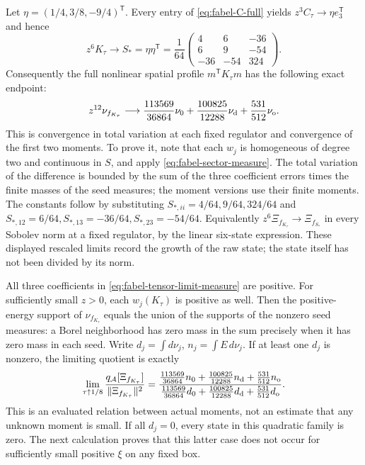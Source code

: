 Let $\eta=(1/4,3/8,-9/4)^{\mathsf T}$.
Every entry of \eqref{eq:fabel-C-full} yields
$z^3C_\tau\to\eta e_3^{\mathsf T}$ and hence
\[
 z^6K_\tau\longrightarrow S_*=\eta\eta^{\mathsf T}
 =\frac1{64}\begin{pmatrix}4&6&-36\\6&9&-54\\-36&-54&324\end{pmatrix}.
\]
Consequently the full nonlinear spatial profile
$m^{\mathsf T}K_\tau m$ has the following exact endpoint:
\begin{equation}\label{eq:fabel-tensor-limit-measure}
 z^{12}\nu_{f_{K_\tau}}\longrightarrow
 \frac{113569}{36864}\nu_0+
 \frac{100825}{12288}\nu_{\rm d}+
 \frac{531}{512}\nu_{\rm o}.
\end{equation}
This is convergence in total variation at each fixed regulator and
convergence of the first two moments. To prove it, note that each
$w_j$ is homogeneous of degree two and continuous in $S$, and apply
\eqref{eq:fabel-sector-measure}. The total variation of the difference
is bounded by the sum of the three coefficient errors times the finite
masses of the seed measures; the moment versions use their finite moments.
The constants follow by substituting $S_{*,ii}=4/64,9/64,324/64$ and
$S_{*,12}=6/64,S_{*,13}=-36/64,S_{*,23}=-54/64$.
Equivalently $z^6\Xi_{f_{K_\tau}}\to\Xi_{f_{S_*}}$ in every Sobolev norm
at a fixed regulator, by the linear six-state expression.
These displayed rescaled limits record the growth of the raw state;
the state itself has not been divided by its norm.

All three coefficients in \eqref{eq:fabel-tensor-limit-measure} are positive.
For sufficiently small $z>0$, each $w_j(K_\tau)$ is positive as well.
Then the positive-energy support of $\nu_{f_{K_\tau}}$ equals the union
of the supports of the nonzero seed measures: a Borel neighborhood
has zero mass in the sum precisely when it has zero mass in each seed.
Write $d_j=\int d\nu_j$, $n_j=\int E\,d\nu_j$.
If at least one $d_j$ is nonzero, the limiting quotient is exactly
\begin{equation}\label{eq:fabel-tensor-limit-quotient}
 \lim_{\tau\uparrow1/8}
 \frac{q_{\mathcal A}[\Xi_{f_{K_\tau}}]}{\|\Xi_{f_{K_\tau}}\|^2}
 =
 \frac{\frac{113569}{36864}n_0+
       \frac{100825}{12288}n_{\rm d}+\frac{531}{512}n_{\rm o}}
      {\frac{113569}{36864}d_0+
       \frac{100825}{12288}d_{\rm d}+\frac{531}{512}d_{\rm o}} .
\end{equation}
This is an evaluated relation between actual moments, not an estimate
that any unknown moment is small. If all $d_j=0$, every state in this
quadratic family is zero. The next calculation proves that this latter
case does not occur for sufficiently small positive $\xi$ on any fixed box.


